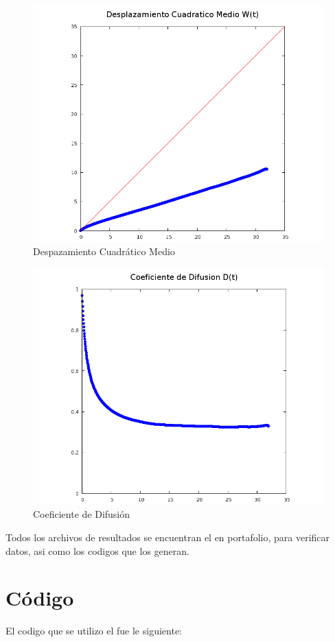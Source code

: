 \documentclass[12pt,letterpaper]{article}
\begin{document}
\begin{figure}[H]
	\centering
	\includegraphics[width=0.5\linewidth]{wdt.png}
	\caption{Despazamiento Cuadrático Medio}
	\label{wdt}
\end{figure}
\begin{figure}[H]
	\centering
	\includegraphics[width=0.5\linewidth]{diff.png}
	\caption{Coeficiente de Difusión}
	\label{ddt}
\end{figure}
Todos los archivos de resultados se encuentran el en portafolio, para verificar datos, asi como los codigos que los generan.
\pagebreak
\section*{Código}
El codigo que se utilizo el fue le siguiente:







\end{document}
